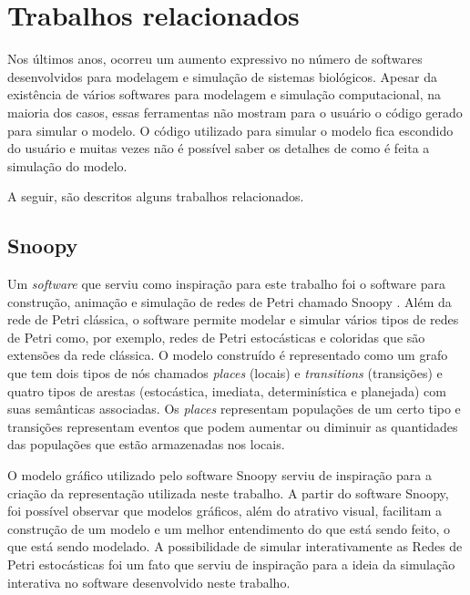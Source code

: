 \documentclass[
	12pt,				%
	openright,			%
	oneside,			%
	a4paper,			%
	main=brazil,
	english,			%
	]{ufsj-abntex2}
\begin{document}
% 

\chapter{Trabalhos relacionados}
\label{chap:relacionados}

Nos últimos anos, ocorreu um aumento expressivo no número de softwares desenvolvidos para modelagem e simulação de sistemas biológicos. Apesar da existência de vários softwares para modelagem e simulação computacional, na maioria dos casos, essas ferramentas não mostram para o usuário o código gerado para simular o modelo. O código utilizado para simular o modelo fica escondido do usuário e muitas vezes não é possível saber os detalhes de como é feita a simulação do modelo.


A seguir, são descritos alguns trabalhos relacionados. 

\section{Snoopy}

Um \textit{software} que serviu como inspiração para este trabalho foi o software para construção, animação e simulação de redes de Petri chamado Snoopy \cite{Heiner2008,Heiner2012,Liu2012}. Além da rede de Petri clássica, o software permite modelar e simular vários tipos de redes de Petri como, por exemplo, redes de Petri estocásticas e coloridas que são extensões da rede clássica. O modelo construído é representado como um grafo que tem dois tipos de nós chamados \textit{places} (locais) e \textit{transitions} (transições) e quatro tipos de arestas (estocástica, imediata, determinística e planejada) com suas semânticas associadas. Os \textit{places} representam populações de um certo tipo e transições representam eventos que podem aumentar ou diminuir as quantidades das populações que estão armazenadas nos locais. 

O modelo gráfico utilizado pelo software Snoopy serviu de inspiração para a criação da representação utilizada neste trabalho. A partir do software Snoopy, foi possível observar que modelos gráficos, além do atrativo visual, facilitam a construção de um modelo e um melhor entendimento do que está sendo feito, o que está sendo modelado. A possibilidade de simular interativamente as Redes de Petri estocásticas foi um fato que serviu de inspiração para a ideia da simulação interativa no software desenvolvido neste trabalho. 
\end{document}

